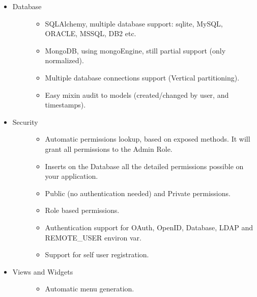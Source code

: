 \documentclass[letterpaper,10pt,english]{sphinxmanual}
\begin{document}
\label{intro:includes}\begin{itemize}
\item {} \begin{description}
\item[{Database}] \leavevmode\begin{itemize}
\item {} 
SQLAlchemy, multiple database support: sqlite, MySQL, ORACLE, MSSQL, DB2 etc.

\item {} 
MongoDB, using mongoEngine, still partial support (only normalized).

\item {} 
Multiple database connections support (Vertical partitioning).

\item {} 
Easy mixin audit to models (created/changed by user, and timestamps).

\end{itemize}

\end{description}

\item {} \begin{description}
\item[{Security}] \leavevmode\begin{itemize}
\item {} 
Automatic permissions lookup, based on exposed methods. It will grant all permissions to the Admin Role.

\item {} 
Inserts on the Database all the detailed permissions possible on your application.

\item {} 
Public (no authentication needed) and Private permissions.

\item {} 
Role based permissions.

\item {} 
Authentication support for OAuth, OpenID, Database, LDAP and REMOTE\_USER environ var.

\item {} 
Support for self user registration.

\end{itemize}

\end{description}

\item {} \begin{description}
\item[{Views and Widgets}] \leavevmode\begin{itemize}
\item {} 
Automatic menu generation.


\end{itemize}
\end{description}
\end{itemize}
\end{document}
